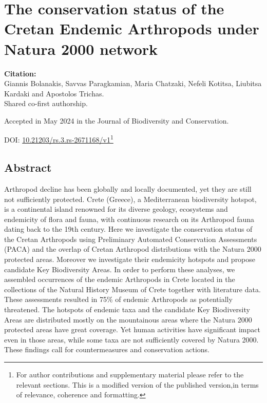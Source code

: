 % 
% 


\chapter{The conservation status of the Cretan Endemic Arthropods under Natura 2000 network}
\label{cha:arthropods}


\textbf{Citation:} \\ 
Giannis Bolanakis, Savvas Paragkamian, Maria Chatzaki, Nefeli Kotitsa, Liubitsa Kardaki and Apostolos Trichas.\\

Shared co-first authorship.

Accepted in May 2024 in the Journal of Biodiversity and Conservation.

DOI: \href{https://doi.org/10.21203/rs.3.rs-2671168/v1}{10.21203/rs.3.rs-2671168/v1}\footnote{
   For author contributions and supplementary material please refer to the relevant sections. 
   This is a modified version of the published version,in terms of relevance, coherence and formatting.}


\section{Abstract}

Arthropod decline has been globally and locally documented, yet they are still
not sufficiently protected. Crete (Greece), a Mediterranean biodiversity
hotspot, is a continental island renowned for its diverse geology, ecosystems
and endemicity of flora and fauna, with continuous research on its Arthropod
fauna dating back to the 19th century. Here we investigate the conservation
status of the Cretan Arthropods using Preliminary Automated Conservation
Assessments (PACA) and the overlap of Cretan Arthropod distributions with the
Natura 2000 protected areas. Moreover we investigate their endemicity hotspots
and propose candidate Key Biodiversity Areas. In order to perform these
analyses, we assembled occurrences of the endemic Arthropods in Crete located
in the collections of the Natural History Museum of Crete together with
literature data. These assessments resulted in 75\% of endemic Arthropods as
potentially threatened. The hotspots of endemic taxa and the candidate Key
Biodiversity Areas are distributed mostly on the mountainous areas where the
Natura 2000 protected areas have great coverage. Yet human activities have
significant impact even in those areas, while some taxa are not sufficiently
covered by Natura 2000. These findings call for countermeasures and conservation actions.


